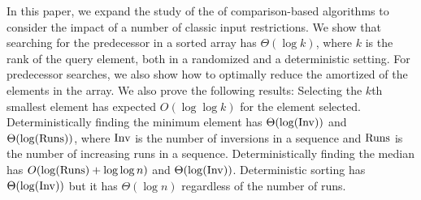 In this paper, we expand the study of the \frag of comparison-based
algorithms to consider the impact of a number of classic input
restrictions. We show that searching for the predecessor in a sorted
array has \frag $\Theta(\log k)$, where $k$ is the rank of the query
element, both in a randomized and a deterministic setting. For
predecessor searches, we also show how to optimally reduce the
amortized \frag of the elements in the array. We also prove the
following results: Selecting the $k$th smallest element has expected
\frag $O(\log\log k)$ for the element selected.  Deterministically
finding the minimum element has \frag $\Theta(\log(\mathrm{Inv}))$ and
$\Theta(\log(\mathrm{Runs}))$, where $\mathrm{Inv}$ is the number of inversions in a
sequence and $\mathrm{Runs}$ is the number of increasing runs in a sequence.
Deterministically finding the median has \frag
$O(\log(\mathrm{Runs}) + \log\log n)$ and $\Theta(\log (\mathrm{Inv}))$.
Deterministic sorting has \frag $\Theta(\log (\mathrm{Inv}))$ but it has \frag
$\Theta(\log n)$ regardless of the number of runs.
